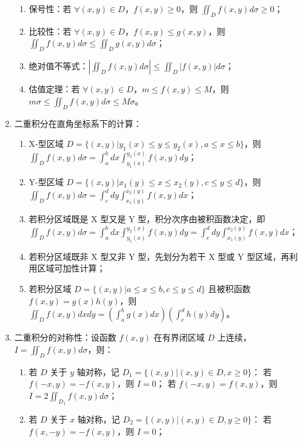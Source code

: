 \documentclass[UTF8]{ctexart}
\theoremstyle{remark}
\begin{document}
\begin{enumerate}
\begin{enumerate}
				\item 保号性：若 \(\forall(x, y) \in D\)，\(f(x, y) \geq 0\)，则 \(\iint_{D} f(x, y) d \sigma \geq 0\)；
				\item 比较性：若 \(\forall(x, y) \in D\)，\(f(x, y) \leq g(x, y)\)，则 \(\iint_{D} f(x, y) d \sigma \leq \iint_{D} g(x, y) d \sigma\)；
				\item 绝对值不等式：\(\left|\iint_{D} f(x, y) d \sigma\right| \leq \iint_{D}|f(x, y)| d \sigma\)；
				\item 估值定理：若 \(\forall(x, y) \in D\)，\(m \leq f(x, y) \leq M\)，则 \(m \sigma \leq \iint_{D} f(x, y) d \sigma \leq M \sigma\)。
			\end{enumerate}
			\item 二重积分在直角坐标系下的计算：
			\begin{enumerate}
				\item X-型区域 \(D = \{(x, y) | y_{1}(x) \leq y \leq y_{2}(x), a \leq x \leq b\}\)，则 \(\iint_{D} f(x, y) d \sigma = \int_{a}^{b} d x \int_{y_{1}(x)}^{y_{2}(x)} f(x, y) d y\)；
				\item Y-型区域 \(D = \{(x, y) | x_{1}(y) \leq x \leq x_{2}(y), c \leq y \leq d\}\)，则 \(\iint_{D} f(x, y) d \sigma = \int_{c}^{d} d y \int_{x_{1}(y)}^{x_{2}(y)} f(x, y) d x\)；
				\item 若积分区域既是 X 型又是 Y 型，积分次序由被积函数决定，即 \(\iint_{D} f(x, y) d \sigma = \int_{a}^{b} d x \int_{y_{1}(x)}^{y_{2}(x)} f(x, y) d y = \int_{c}^{d} d y \int_{x_{1}(y)}^{x_{2}(y)} f(x, y) d x\)；
				\item 若积分区域既非 X 型又非 Y 型，先划分为若干 X 型或 Y 型区域，再利用区域可加性计算；
				\item 若积分区域 \(D = \{(x, y) | a \leq x \leq b, c \leq y \leq d\}\) 且被积函数 \(f(x, y) = g(x) h(y)\)，则 \(\iint_{D} f(x, y) d x d y = \left(\int_{a}^{b} g(x) d x\right)\left(\int_{c}^{d} h(y) d y\right)\)。
			\end{enumerate}
			\item 二重积分的对称性：设函数 \(f(x, y)\) 在有界闭区域 \(D\) 上连续，\(I = \iint_{D} f(x, y) d \sigma\)，则：
			\begin{enumerate}
				\item 若 \(D\) 关于 \(y\) 轴对称，记 \(D_{1} = \{(x, y) | (x, y) \in D, x \geq 0\}\)：
	若 \(f(-x, y) = -f(x, y)\)，则 \(I = 0\)；
	若 \(f(-x, y) = f(x, y)\)，则 \(I = 2 \iint_{D_{1}} f(x, y) d \sigma\)；
				\item 若 \(D\) 关于 \(x\) 轴对称，记 \(D_{2} = \{(x, y) | (x, y) \in D, y \geq 0\}\)：
	若 \(f(x, -y) = -f(x, y)\)，则 \(I = 0\)；

\end{enumerate}
\end{enumerate}
\end{document}
